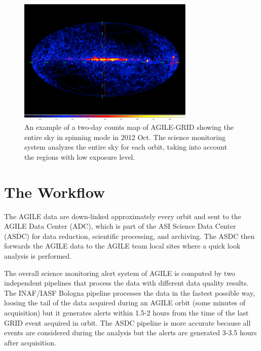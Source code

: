 \begin{figure}[t]
\centering
\includegraphics[width=0.75\textwidth]{part10/Bulgarelli_O05/O.05_1c.eps}
\caption{An example of a two-day counts map of AGILE-GRID showing the entire sky in spinning mode in 2012 Oct. The science monitoring system analyzes the entire sky for each orbit, taking into account the regions with low exposure level.} \label{fig_fov}
\end{figure}

\section{The Workflow}

The AGILE data are down-linked approximately every orbit and sent to the AGILE Data Center (ADC), which is part of the ASI Science Data Center (ASDC) for data reduction, scientific processing, and archiving. The ASDC then forwards the AGILE data to the AGILE team local sites where a quick look analysis is performed.

The overall science monitoring alert system of AGILE is computed by two independent pipelines that process the data with different data quality results. The INAF/IASF Bologna pipeline processes the data in the fastest possible way, loosing the tail of the data acquired during an AGILE orbit (some minutes of acquisition) but it generates alerts within 1.5-2 hours from the time of the last GRID event acquired in orbit. The ASDC pipeline is more accurate because all events are considered during the analysis but the alerts are generated 3-3.5 hours after acquisition.

